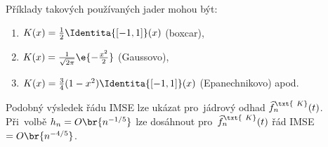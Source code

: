 \begin{remark}
	Příklady takových používaných jader mohou být: \begin{enumerate}
		\item $K(x)=\frac{1}{2}\Identita{[-1,1]}(x)$ (boxcar),
		\item $K(x)=\frac{1}{\sqrt{2\pi}}\e{-\frac{x^2}{2}}$ (Gaussovo),
		\item $K(x)=\frac{3}{4}(1-x^2)\Identita{[-1,1]}(x)$ (Epanechnikovo) apod.
	\end{enumerate}
\end{remark}
\begin{remark}
Podobný výsledek řádu IMSE lze ukázat pro~jádrový odhad $\widehat{f}_n^\txt{~K}(t)$. Při~volbě $h_n=O\br{n^{-1/5}}$ lze dosáhnout pro~$\widehat{f}_n^\txt{~K}(t)$ řád IMSE$=O\br{n^{-4/5}}$.
\end{remark}